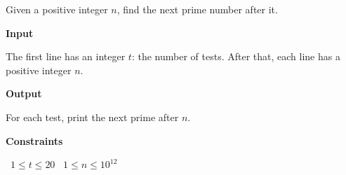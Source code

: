 Given a positive integer $n$, find the next prime number after it.

\vspace{0.3cm}\noindent\textbf{Input}

The first line has an integer $t$: the number of tests.
After that, each line has a positive integer $n$.

\vspace{0.3cm}\noindent\textbf{Output}

For each test, print the next prime after $n$.

\vspace{0.3cm}\noindent\textbf{Constraints}

\textbullet\ $1 \le t \le 20$
\textbullet\ $1 \le n \le 10^{12}$